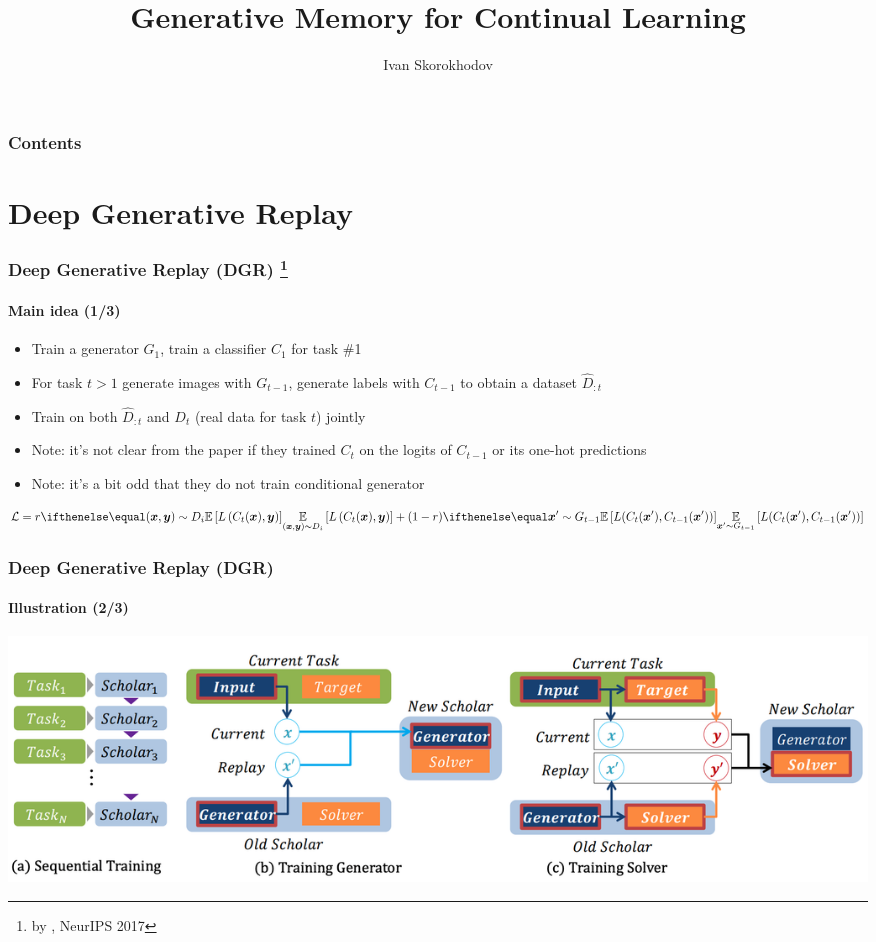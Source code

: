 \documentclass[10pt]{beamer}
\title{Generative Memory for Continual Learning}
\author{Ivan Skorokhodov}
\newcommand{\citepaper}[1]{\citetitle{#1} by \citeauthor{#1}}
\begin{document}
\begin{frame}
    \titlepage
\end{frame}


\begin{frame}
    \frametitle{Contents}
    \tableofcontents
\end{frame}

\section{Deep Generative Replay}
\begin{frame}
    \frametitle{Deep Generative Replay (DGR) \footnote{\citepaper{DGR}, NeurIPS 2017}}
    \framesubtitle{Main idea (1/3)}
    
    \begin{itemize}
        \item Train a generator $G_1$, train a classifier $C_1$ for task \#1
        \item For task $t > 1$ generate images with $G_{t-1}$, generate labels with $C_{t-1}$ to obtain a dataset $\hat{D}_{:t}$
        \item Train on both $\hat{D}_{:t}$ and $D_t$ (real data for task $t$) jointly
        \item Note: it's not clear from the paper if they trained $C_t$ on the logits of $C_{t-1}$ or its one-hot predictions
        \item Note: it's a bit odd that they do not train conditional generator
    \end{itemize}
    
    \[
    \mathcal{L} = r \expect[(\boldsymbol{x}, \boldsymbol{y}) \sim D_{i}]{L\left(C_t(\boldsymbol{x}), \boldsymbol{y}\right)}+(1-r) \expect[\boldsymbol{x}' \sim G_{t-1}]{L(C_t(\boldsymbol{x}'), C_{t-1}(\boldsymbol{x}'))}
    \]
\end{frame}

\begin{frame}
    \frametitle{Deep Generative Replay (DGR)}
    \framesubtitle{Illustration (2/3)}

    \includegraphics[width=\textwidth]{images/dgr.png}
\end{frame}
\end{document}
